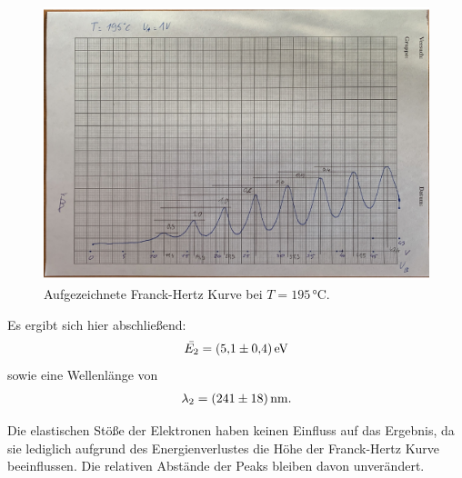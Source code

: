 \begin{figure}[H]
  \centering
  \includegraphics[height=8cm]{content/data/FH_195.pdf}
  \caption{Aufgezeichnete Franck-Hertz Kurve bei $T=195\,\unit{\celsius}$.}
  \label{fig:FHZ 195Grad}
\end{figure}

Es ergibt sich hier abschließend:
\begin{gather*}
  \bar{E_2}=\qty{5.1+-0.4}{\electronvolt}
\end{gather*}
sowie eine Wellenlänge von
\begin{gather*}
  \lambda_2=\qty{241+-18}{\nano\meter}.
\end{gather*}

Die elastischen Stöße der Elektronen haben keinen Einfluss auf das Ergebnis, da sie lediglich aufgrund des
Energienverlustes die Höhe der Franck-Hertz Kurve beeinflussen. Die relativen Abstände der Peaks bleiben 
davon unverändert.
